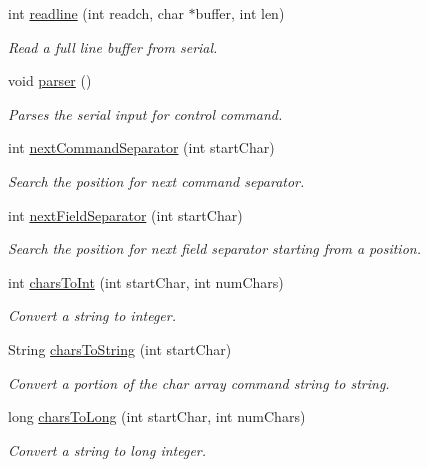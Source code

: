 int \hyperlink{_meditech___chip_kit_control_panel_8pde_ad425a899bc1884bbf9a24d56ba4d6f53}{readline} (int readch, char $\ast$buffer, int len)
\begin{DoxyCompactList}\small\item\em Read a full line buffer from serial. \end{DoxyCompactList}\item 
void \hyperlink{_meditech___chip_kit_control_panel_8pde_ac15f7c36f6055edec43d0f0f611c4dc0}{parser} ()
\begin{DoxyCompactList}\small\item\em Parses the serial input for control command. \end{DoxyCompactList}\item 
int \hyperlink{_meditech___chip_kit_control_panel_8pde_a4b62bbf3dd6cf7eb7fee557932fd1b7c}{next\-Command\-Separator} (int start\-Char)
\begin{DoxyCompactList}\small\item\em Search the position for next command separator. \end{DoxyCompactList}\item 
int \hyperlink{_meditech___chip_kit_control_panel_8pde_a6b0edf09b0e4b4ed48c9213d14d27efa}{next\-Field\-Separator} (int start\-Char)
\begin{DoxyCompactList}\small\item\em Search the position for next field separator starting from a position. \end{DoxyCompactList}\item 
int \hyperlink{_meditech___chip_kit_control_panel_8pde_ad893e606e19944faa6540bba9387370f}{chars\-To\-Int} (int start\-Char, int num\-Chars)
\begin{DoxyCompactList}\small\item\em Convert a string to integer. \end{DoxyCompactList}\item 
String \hyperlink{_meditech___chip_kit_control_panel_8pde_af256eb98be4447dd754239d6c5cf4792}{chars\-To\-String} (int start\-Char)
\begin{DoxyCompactList}\small\item\em Convert a portion of the char array command string to string. \end{DoxyCompactList}\item 
long \hyperlink{_meditech___chip_kit_control_panel_8pde_ac6fe1eb1fb2d6c60ea6e06cacfa0fda7}{chars\-To\-Long} (int start\-Char, int num\-Chars)
\begin{DoxyCompactList}\small\item\em Convert a string to long integer. \end{DoxyCompactList}\item 
